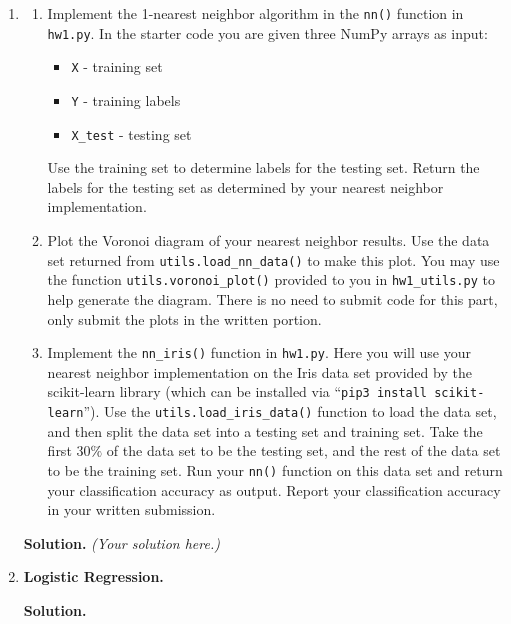 \documentclass{article}
\theoremstyle{definition}
\theoremstyle{remark}
\newenvironment{Q}
        {%
          \clearpage
          \item
        }
        {%
          \phantom{s} %
          \bigskip
          \textbf{Solution.}
        }
\begin{document}
\begin{enumerate}
\begin{Q}
          \begin{enumerate}
          \item Implement the 1-nearest neighbor algorithm in the \texttt{nn()} function in \texttt{hw1.py}. In the starter code you are given three NumPy arrays as input:
    	\begin{itemize}
    	  \item \texttt{X} - training set
    	  \item \texttt{Y} - training labels
          \item \texttt{X\_test} - testing set
          \end{itemize}
          Use the training set to determine labels for the testing set. Return the labels for the testing set as determined by your nearest neighbor implementation.
          \item Plot the Voronoi diagram of your nearest neighbor results. Use the data set returned from \texttt{utils.load\_nn\_data()} to make this plot. You may use the function \texttt{utils.voronoi\_plot()} provided to you in \texttt{hw1\_utils.py} to help generate the diagram.  There is no need to submit code for this part, only submit the plots in the written portion.
           \item Implement the \texttt{nn\_iris()} function in \texttt{hw1.py}.  Here you will use your nearest neighbor implementation on the Iris data set provided by the scikit-learn library (which can be installed via ``\texttt{pip3 install scikit-learn}'').  Use the \texttt{utils.load\_iris\_data()} function to load the data set, and then split the data set into a testing set and training set.  Take the first $30\%$ of the data set to be the testing set, and the rest of the data set to be the training set.  Run your \texttt{nn()} function on this data set and return your classification accuracy as output.  Report your classification accuracy in your written submission.
          \end{enumerate}
          \end{Q}
          \emph{(Your solution here.)}
          \begin{Q}
          \textbf{Logistic Regression.}


\end{Q}
\end{enumerate}
\end{document}
